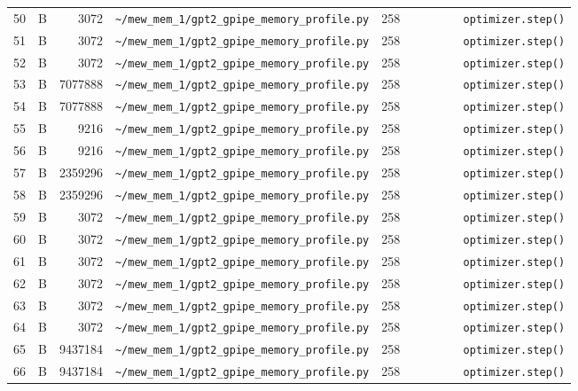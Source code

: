 \documentclass{article}
\begin{document}
\begin{longtable}{r l r p{6.5cm} r p{7.0cm}}
50 & B & 3072 & \lstinline|~/mew_mem_1/gpt2_gpipe_memory_profile.py| & 258 & \lstinline|        optimizer.step()| \\
51 & B & 3072 & \lstinline|~/mew_mem_1/gpt2_gpipe_memory_profile.py| & 258 & \lstinline|        optimizer.step()| \\
52 & B & 3072 & \lstinline|~/mew_mem_1/gpt2_gpipe_memory_profile.py| & 258 & \lstinline|        optimizer.step()| \\
53 & B & 7077888 & \lstinline|~/mew_mem_1/gpt2_gpipe_memory_profile.py| & 258 & \lstinline|        optimizer.step()| \\
54 & B & 7077888 & \lstinline|~/mew_mem_1/gpt2_gpipe_memory_profile.py| & 258 & \lstinline|        optimizer.step()| \\
55 & B & 9216 & \lstinline|~/mew_mem_1/gpt2_gpipe_memory_profile.py| & 258 & \lstinline|        optimizer.step()| \\
56 & B & 9216 & \lstinline|~/mew_mem_1/gpt2_gpipe_memory_profile.py| & 258 & \lstinline|        optimizer.step()| \\
57 & B & 2359296 & \lstinline|~/mew_mem_1/gpt2_gpipe_memory_profile.py| & 258 & \lstinline|        optimizer.step()| \\
58 & B & 2359296 & \lstinline|~/mew_mem_1/gpt2_gpipe_memory_profile.py| & 258 & \lstinline|        optimizer.step()| \\
59 & B & 3072 & \lstinline|~/mew_mem_1/gpt2_gpipe_memory_profile.py| & 258 & \lstinline|        optimizer.step()| \\
60 & B & 3072 & \lstinline|~/mew_mem_1/gpt2_gpipe_memory_profile.py| & 258 & \lstinline|        optimizer.step()| \\
61 & B & 3072 & \lstinline|~/mew_mem_1/gpt2_gpipe_memory_profile.py| & 258 & \lstinline|        optimizer.step()| \\
62 & B & 3072 & \lstinline|~/mew_mem_1/gpt2_gpipe_memory_profile.py| & 258 & \lstinline|        optimizer.step()| \\
63 & B & 3072 & \lstinline|~/mew_mem_1/gpt2_gpipe_memory_profile.py| & 258 & \lstinline|        optimizer.step()| \\
64 & B & 3072 & \lstinline|~/mew_mem_1/gpt2_gpipe_memory_profile.py| & 258 & \lstinline|        optimizer.step()| \\
65 & B & 9437184 & \lstinline|~/mew_mem_1/gpt2_gpipe_memory_profile.py| & 258 & \lstinline|        optimizer.step()| \\
66 & B & 9437184 & \lstinline|~/mew_mem_1/gpt2_gpipe_memory_profile.py| & 258 & \lstinline|        optimizer.step()| \\

\end{longtable}
\end{document}
